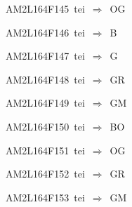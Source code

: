 {\sixrm AM2L164F145\ {\sixit tei}\ }$\Rightarrow$\ OG\par\smallskip
{\sixrm AM2L164F146\ {\sixit tei}\ }$\Rightarrow$\ B\par\smallskip
{\sixrm AM2L164F147\ {\sixit tei}\ }$\Rightarrow$\ G\par\smallskip
{\sixrm AM2L164F148\ {\sixit tei}\ }$\Rightarrow$\ GR\par\smallskip
{\sixrm AM2L164F149\ {\sixit tei}\ }$\Rightarrow$\ GM\par\smallskip
{\sixrm AM2L164F150\ {\sixit tei}\ }$\Rightarrow$\ BO\par\smallskip
{\sixrm AM2L164F151\ {\sixit tei}\ }$\Rightarrow$\ OG\par\smallskip
{\sixrm AM2L164F152\ {\sixit tei}\ }$\Rightarrow$\ GR\par\smallskip
{\sixrm AM2L164F153\ {\sixit tei}\ }$\Rightarrow$\ GM\par\smallskip

